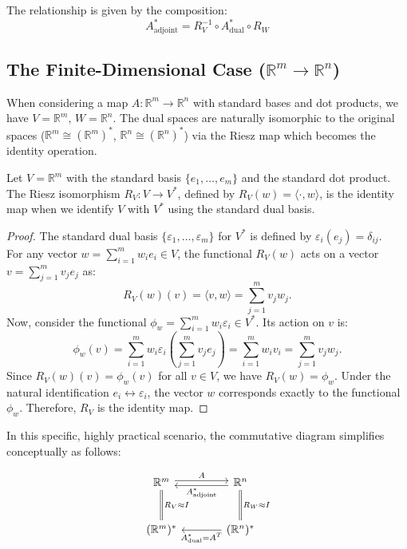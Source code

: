 \begin{notechapter}
The relationship is given by the composition:
\[
A_{\text{adjoint}}^{*} = R_{V}^{-1} \circ A_{\text{dual}}^{*} \circ R_{W}
\]

\subsection{The Finite-Dimensional Case ($\mathbb{R}^m \to \mathbb{R}^n$)}

When considering a map $A: \mathbb{R}^m \to \mathbb{R}^n$ with standard bases and dot products, we have $V = \mathbb{R}^m$, $W = \mathbb{R}^n$. The dual spaces are naturally isomorphic to the original spaces ($\mathbb{R}^m \cong (\mathbb{R}^m)^*$, $\mathbb{R}^n \cong (\mathbb{R}^n)^*$) via the Riesz map which becomes the identity operation.

\begin{lemma}
Let $V = \mathbb{R}^m$ with the standard basis $\{e_1, \dots, e_m\}$ and the standard dot product. The Riesz isomorphism $R_V : V \to V^*$, defined by $R_V(w) = \langle \cdot, w \rangle$, is the identity map when we identify $V$ with $V^*$ using the standard dual basis.
\end{lemma}

\begin{proof}
The standard dual basis $\{\varepsilon_1, \dots, \varepsilon_m\}$ for $V^*$
is defined by $\varepsilon_i(e_j) = \delta_{ij}$.\\
For any vector $w = \sum_{i=1}^m w_i e_i \in V$, the functional $R_V(w)$ acts on a vector $v = \sum_{j=1}^m v_j e_j$ as:
\[
R_V(w)(v) = \langle v, w \rangle = \sum_{j=1}^m v_j w_j.
\]
Now, consider the functional $\phi_w = \sum_{i=1}^m w_i \varepsilon_i \in V^*$. Its action on $v$ is:
\[
\phi_w(v) = \sum_{i=1}^m w_i \varepsilon_i\left(\sum_{j=1}^m v_j e_j\right) = \sum_{i=1}^m w_i v_i = \sum_{j=1}^m v_j w_j.
\]
Since $R_V(w)(v) = \phi_w(v)$ for all $v \in V$, we have $R_V(w) = \phi_w$. Under the natural identification $e_i \leftrightarrow \varepsilon_i$, the vector $w$ corresponds exactly to the functional $\phi_w$. Therefore, $R_V$ is the identity map.
\end{proof}

In this specific, highly practical scenario, the commutative diagram simplifies conceptually as follows:

\[
\begin{tikzcd}[row sep=large, column sep=large]
\mathbb{R}^m \arrow[d, equal, "R_V \approx I"] \arrow[r, "A" {above}, shift left=0.5ex] & 
\mathbb{R}^n \arrow[d, equal, "R_W \approx I"] \arrow[l, "A^*_{\text{adjoint}}" {below}, shift left=0.5ex]\\
(\mathbb{R}^m)^* & (\mathbb{R}^n)^* \arrow[l, "{A^*_{\text{dual}} = A^T}" {below}]
\end{tikzcd}
\]


\end{notechapter}
